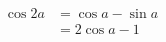 \documentclass[12pt, a4paper]{article}
\begin{document}
%		
%		
%		
\begin{LTXexample}
	\begin{align}
	\cos 2a & = \cos a - \sin a \nonumber \\
		& = 2\cos a - 1
\end{align}
\end{LTXexample}
%

%
%
%
%
%
%
%
\end{document}
